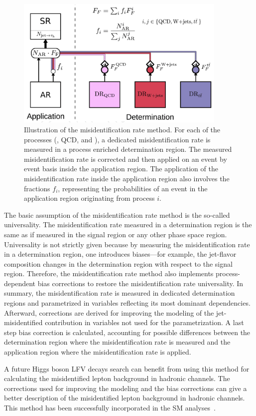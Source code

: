 \begin{figure}[htbp]
  \centering
  \includegraphics[width=0.9\textwidth]{plots/appendix/FF.png}
  \caption{Illustration of the misidentification rate method. For each of the processes (\wjets, QCD, and \ttbar), a dedicated misidentification rate is measured in a process enriched determination region. The measured misidentification rate is corrected and then applied on an event by event basis inside the application region. The application of the misidentification rate inside the application region also involves the fractions $f_i$, representing the probabilities of an event in the application region originating from process $i$.}
  \label{fig:ff}
\end{figure}

The basic assumption of the misidentification rate method is the so-called universality. The misidentification rate measured in a determination region is the same as if measured in the signal region or any other phase space region. Universality is not strictly given because by measuring the misidentification rate in a determination region, one introduces biases—for example, the jet-flavor composition changes in the determination region with respect to the signal region. Therefore, the misidentification rate method also implements process-dependent bias corrections to restore the misidentification rate universality. In summary, the misidentification rate is measured in dedicated determination regions and parametrized in variables reflecting its most dominant dependencies. Afterward, corrections are derived for improving the modeling of the jet-\tauh misidentified contribution in variables not used for the parametrization. A last step bias correction is calculated, accounting for possible differences between the determination region where the misidentification rate is measured and the application region where the misidentification rate is applied.

A future Higgs boson LFV decays search can benefit from using this method for calculating the misidentified lepton background in hadronic channels. The corrections used for improving the modeling and the bias corrections can give a better description of the misidentified lepton background in hadronic channels. This method has been successfully incorporated in the SM \Htt analyses~\cite{CMS:2019pyn}.
